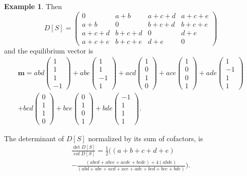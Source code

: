 \documentclass[12pt]{amsart}
\theoremstyle{definition}
\newtheorem{eg}[thm]{Example}
\newcommand{\boldm}{\mathbf{m}}
\DeclareMathOperator{\cof}{cof}
\begin{document}
\begin{eg}
Then
\[
	D[S] = \begin{pmatrix}
	0 & a + b & a + c + d & a + c + e \\
	a + b & 0 & b + c + d & b + c + e \\
	a + c + d & b + c + d & 0 & d + e \\
	a + c + e & b + c + e & d + e & 0
	\end{pmatrix}
\]
and the equilibrium vector is
\begin{multline}
	\boldm = 
	abd \begin{pmatrix} 1 \\ 1 \\ 1 \\ -1 \end{pmatrix} 
	+ abe \begin{pmatrix} 1 \\ 1 \\ -1 \\ 1 \end{pmatrix} 
	+ acd \begin{pmatrix} 1 \\ 0 \\ 1 \\ 0 \end{pmatrix} 
	+ ace \begin{pmatrix} 1 \\ 0 \\ 0 \\ 1 \end{pmatrix} 
	+ ade \begin{pmatrix} 1 \\ -1 \\ 1 \\ 1 \end{pmatrix} \\
	+ bcd \begin{pmatrix} 0 \\ 1 \\ 1 \\ 0 \end{pmatrix} 
	+ bce \begin{pmatrix} 0 \\ 1 \\ 0 \\ 1 \end{pmatrix} 
	+ bde \begin{pmatrix} -1 \\ 1 \\ 1 \\ 1 \end{pmatrix} .
\end{multline}

The determinant of $D[S]$ normalized by its sum of cofactors, is
\begin{multline}
	\frac{\det D[S]}{\cof D[S]} 
	= \frac{1}{2} \Big( (a + b + c + d + e)  \\
	 - \frac{(abcd + abce + acde + bcde) + 4 (abde)}{(abd + abe + acd + ace + ade + bcd + bce + bde)} \Big).
\end{multline}
\end{eg}


 


\vspace{3mm}
\end{document}
